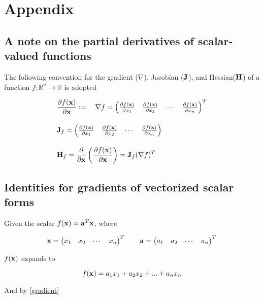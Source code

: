 \documentclass{article}
\newcommand{\R}{\mathbb{R}}
\newcommand{\vect}[1]{\textbf{\textrm{#1}}}
\newcommand{\pd}[2]{\frac{\partial {#1}}{\partial {#2}}}
\begin{document}
\section{Appendix} \label{appendix}

\subsection{A note on the partial derivatives of scalar-valued functions}
The following convention for the gradient ($\nabla$), Jacobian ($\vect{J}$), and Hessian($\vect{H}$) of a function $f: \R^n \rightarrow \R$ is adopted

\begin{align}
	& \pd{f(\vect{x})}{\vect{x}} := \quad \nabla f = 
	\begin{pmatrix}
		\pd{f(\vect{x})}{x_1} & \pd{f(\vect{x})}{x_2} & \cdots & \pd{f(\vect{x})}{x_n}
	\end{pmatrix}^{T} \label{gradient} \\[1em]
	& \vect{J}_f = 
	\begin{pmatrix}
		\pd{f(\vect{x})}{x_1} & \pd{f(\vect{x})}{x_2} & \cdots & \pd{f(\vect{x})}{x_n}
	\end{pmatrix} \label{jacobian} \\[1em]
	& \vect{H}_f = \pd{}{\vect{x}} \left( \pd{f(\vect{x})}{\vect{x}} \right) 
	= \vect{J}_f(\nabla f)^{T} \label{hessian}
\end{align}	

\subsection{Identities for gradients of vectorized scalar forms}
Given the scalar $f(\vect{x}) = \vect{a}^{T}\vect{x}$, where

\begin{equation*}
	\vect{x}= 
	\begin{pmatrix}
		x_1 & x_2 & \cdots & x_n
	\end{pmatrix}^{T}
	\qquad \vect{a} = 
	\begin{pmatrix}
		a_1 & a_2 & \cdots & a_n
	\end{pmatrix}^{T}
\end{equation*}

$f(\vect{x})$ expands to

\begin{equation*}
	f(\vect{x}) = a_1x_1 + a_2x_2 + ... + a_nx_n
\end{equation*}

And by \eqref{gradient}
\end{document}
